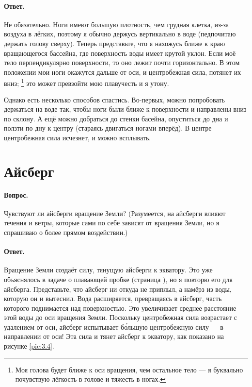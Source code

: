 \paragraph*{Ответ.}
Не обязательно.
Ноги имеют большую плотность, чем грудная клетка, из-за воздуха в лёгких, поэтому я обычно держусь вертикально в воде (педпочитаю держать голову сверху).
Теперь представьте, что я нахожусь ближе к краю вращающегося бассейна, где поверхность воды имеет крутой уклон. Если моё тело перпендикулярно поверхности, то оно лежит почти горизонтально.
В этом положении мои ноги окажутся дальше от оси, и центробежная сила, потянет их вниз;%
\footnote{Моя голова будет ближе к оси вращения, чем остальное тело --- я буквально почувствую лёгкость в голове и тяжесть в ногах.}
это может превзойти мою плавучесть и я утону.

Однако есть несколько способов спастись.
Во-первых, можно попробовать держаться на воде так, чтобы ноги были ближе к поверхности и направлены вниз по склону.
А ещё можно добраться до стенки басейна, опуститься до дна и ползти по дну к центру (стараясь двигаться ногами вперёд).
В центре центробежная сила исчезнет, и можно всплывать.

\section{Айсберг}\label{sec:iceberg}

\paragraph*{Вопрос.} Чувствуют ли айсберги вращение Земли?
(Разумеется, на айсберги влияют течения и ветры, которые сами по себе зависят от вращения Земли, но я спрашиваю о более прямом воздействии.)

\paragraph*{Ответ.}
Вращение Земли создаёт силу, тянущую айсберги к экватору.
Это уже объяснялось в задаче о плавающей пробке (страница \pageref{sec:cork}),
но я повторю его для айсберга.
Представьте, что айсберг ни откуда не приплыл, а намёрз из воды, которую он и вытеснил.
Вода расширяется, превращаясь в айсберг, часть которого поднимается над поверхностью.
Это увеличивает среднее расстояние этой воды до оси вращения Земли.
Поскольку центробежная сила возрастает с удалением от оси, айсберг испытывает б\'{о}льшую центробежную силу — в направлении от оси!
Эта сила и тянет айсберг к экватору, как показано на рисунке \ref{pic:3.4}.

